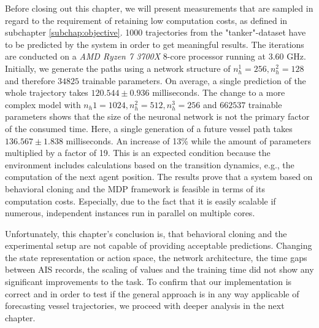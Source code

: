 \par
Before closing out this chapter, we will present measurements that are sampled in regard to the requirement of retaining low computation costs, as defined in subchapter \ref{subchap:objective}. 1000 trajectories from the "tanker"-dataset have to be predicted by the system in order to get meaningful results. The iterations are conducted on a \textit{AMD Ryzen 7 3700X} 8-core processor running at 3.60 GHz. Initially, we generate the paths using a network structure of $n_h^1=256, n_h^2=128$ and therefore $34825$ trainable parameters. On average, a single prediction of the whole trajectory takes $120.544 \pm 0.936$ milliseconds. The change to a more complex model with $n_h1=1024, n_h^2=512, n_h^3=256$ and $662537$ trainable parameters shows that the size of the neuronal network is not the primary factor of the consumed time. Here, a single generation of a future vessel path takes $136.567 \pm 1.838$ milliseconds. An increase of 13\% while the amount of parameters multiplied by a factor of 19. This is an expected condition because the environment includes calculations based on the transition dynamics, e.g., the computation of the next agent position. The results prove that a system based on behavioral cloning and the MDP framework is feasible in terms of its computation costs. Especially, due to the fact that it is easily scalable if numerous, independent instances run in parallel on multiple cores.
\par
Unfortunately, this chapter's conclusion is, that behavioral cloning and the experimental setup are not capable of providing acceptable predictions.
Changing the state representation or action space, the network architecture, the time gaps between AIS records, the scaling of values and the training time did not show any significant improvements to the task. To confirm that our implementation is correct and in order to test if the general approach is in any way applicable of forecasting vessel trajectories, we proceed with deeper analysis in the next chapter. 